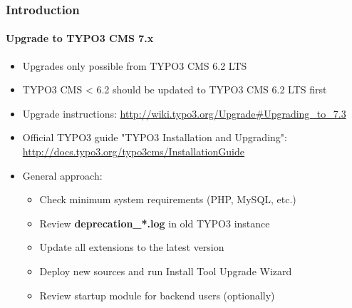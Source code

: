 \begin{frame}[fragile]
	\frametitle{Introduction}
	\framesubtitle{Upgrade to TYPO3 CMS 7.x}

	\begin{itemize}
		\item Upgrades only possible from TYPO3 CMS 6.2 LTS
		\item TYPO3 CMS < 6.2 should be updated to TYPO3 CMS 6.2 LTS first
	\end{itemize}

	\begin{itemize}

		\item Upgrade instructions:\newline
			\smaller\url{http://wiki.typo3.org/Upgrade#Upgrading_to_7.3}\normalsize
		\item Official TYPO3 guide "TYPO3 Installation and Upgrading":
			\smaller\url{http://docs.typo3.org/typo3cms/InstallationGuide}\normalsize
		\item General approach:
			\begin{itemize}
				\item Check minimum system requirements \small(PHP, MySQL, etc.)
				\item Review \textbf{deprecation\_*.log} in old TYPO3 instance
				\item Update all extensions to the latest version
				\item Deploy new sources and run Install Tool \textrightarrow Upgrade Wizard
				\item Review startup module for backend users (optionally)
			\end{itemize}
	\end{itemize}

\end{frame}

